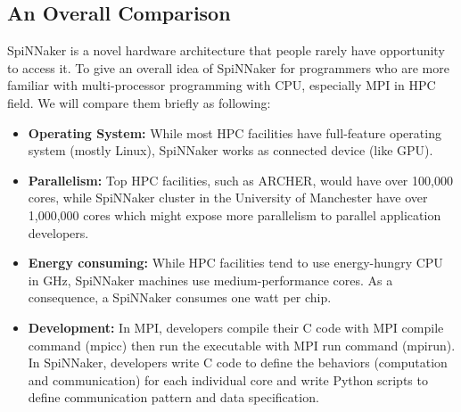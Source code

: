 

\subsection{An Overall Comparison} \label{sec:sb}
SpiNNaker is a novel hardware architecture that people rarely have opportunity to access it. To give an overall idea of SpiNNaker for programmers who are more familiar with multi-processor programming with CPU, especially MPI in HPC field. We will compare them briefly as following:

\begin{itemize}
    \item \textbf{Operating System:} While most HPC facilities have full-feature operating system (mostly Linux), SpiNNaker works as connected device (like GPU). 
    
    \item \textbf{Parallelism:} Top HPC facilities, such as ARCHER, would have over 100,000 cores, while SpiNNaker cluster in the University of Manchester have over 1,000,000 cores which might expose more parallelism to parallel application developers.
    
    \item \textbf{Energy consuming:} While HPC facilities tend to use energy-hungry CPU in GHz, SpiNNaker machines use medium-performance cores. As a consequence, a SpiNNaker consumes one watt per chip.
    
    \item \textbf{Development:} In MPI, developers compile their C code with MPI compile command (mpicc) then run the executable with MPI run  command (mpirun). In SpiNNaker, developers write C code to define the behaviors (computation and communication) for each individual core and write Python scripts to define communication pattern and data specification.
\end{itemize}


